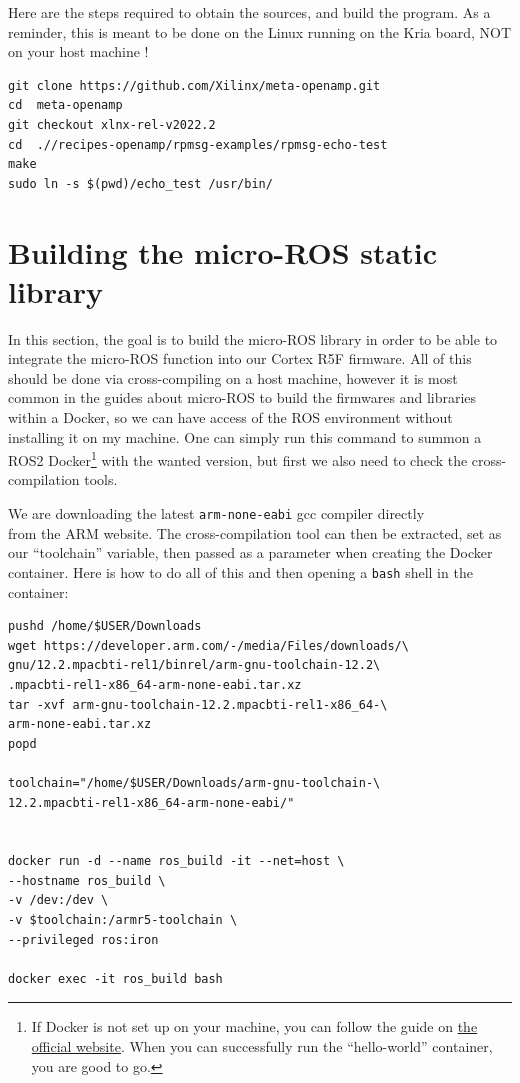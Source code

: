 \documentclass[10pt]{article}
\begin{document}
Here are the steps required to obtain the sources, and build the program.
As a reminder, this is meant to be done on the Linux running on the
Kria board, NOT on your host machine !
\begin{tcolorbox}
\begin{verbatim}
git clone https://github.com/Xilinx/meta-openamp.git
cd  meta-openamp
git checkout xlnx-rel-v2022.2
cd  .//recipes-openamp/rpmsg-examples/rpmsg-echo-test
make
sudo ln -s $(pwd)/echo_test /usr/bin/
\end{verbatim}
\end{tcolorbox}

\section{Building the micro-ROS static library}
\label{sec:building-micro-ros}
In this section, the goal is to build the micro-ROS library in order to be
able to integrate the micro-ROS function into our Cortex R5F firmware.
All of this should be done via cross-compiling on a host machine, however
it is most common in the guides about micro-ROS to build the firmwares and libraries within a Docker,
so we can have access of the ROS environment without installing it on my machine.
One can simply run this command to summon a ROS2 Docker\footnote{If Docker is not set up on your machine, you can follow the guide on \href{https://docs.docker.com/engine/install/ubuntu/}{the official website}. When you can successfully run the ``hello-world'' container, you are good to go.} with the wanted version, but first we also need to check the cross-compilation tools.

We are downloading the latest \verb|arm-none-eabi| gcc compiler directly \\from the ARM website.
The cross-compilation tool can then be extracted, set as our ``toolchain'' variable, then passed as a parameter when creating the Docker container.
Here is how to do all of this and then opening a \verb|bash| shell in the container:
\begin{tcolorbox}
\begin{verbatim}
pushd /home/$USER/Downloads
wget https://developer.arm.com/-/media/Files/downloads/\
gnu/12.2.mpacbti-rel1/binrel/arm-gnu-toolchain-12.2\
.mpacbti-rel1-x86_64-arm-none-eabi.tar.xz
tar -xvf arm-gnu-toolchain-12.2.mpacbti-rel1-x86_64-\
arm-none-eabi.tar.xz
popd

toolchain="/home/$USER/Downloads/arm-gnu-toolchain-\
12.2.mpacbti-rel1-x86_64-arm-none-eabi/"


docker run -d --name ros_build -it --net=host \
--hostname ros_build \
-v /dev:/dev \
-v $toolchain:/armr5-toolchain \
--privileged ros:iron

docker exec -it ros_build bash
\end{verbatim}
\end{tcolorbox}
\end{document}
